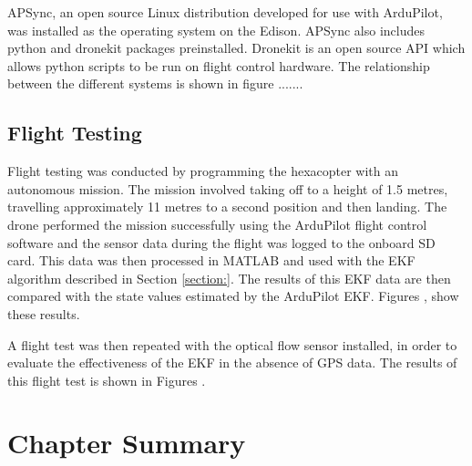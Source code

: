 APSync, an open source Linux distribution developed for use with ArduPilot, was installed as the operating system on the Edison. APSync also includes python and dronekit packages preinstalled. Dronekit is an open source API which allows python scripts to be run on flight control hardware. The relationship between the different systems is shown in figure .......

\subsection{Flight Testing}
Flight testing was conducted by programming the hexacopter with an autonomous mission. The mission involved taking off to a height of 1.5 metres, travelling approximately 11 metres to a second position and then landing. The drone performed the mission successfully using the ArduPilot flight control software and the sensor data during the flight was logged to the onboard SD card. This data was then processed in MATLAB and used with the EKF algorithm described in Section \ref{section:}. The results of this EKF data are then compared with the state values estimated by the ArduPilot EKF. Figures \figref{}, \figref{} show these results.

A flight test was then repeated with the optical flow sensor installed, in order to evaluate the effectiveness of the EKF in the absence of GPS data. The results of this flight test is shown in Figures \figref{}.

\section{Chapter Summary}

\clearpage


